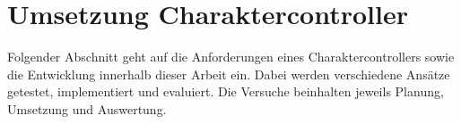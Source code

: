\chapter{Umsetzung Charaktercontroller}
\label{sec:charaktercontroller}
Folgender Abschnitt geht auf die Anforderungen eines Charaktercontrollers sowie die Entwicklung innerhalb dieser Arbeit ein. Dabei werden verschiedene Ansätze getestet, implementiert und evaluiert. Die Versuche beinhalten jeweils Planung, Umsetzung und Auswertung.




